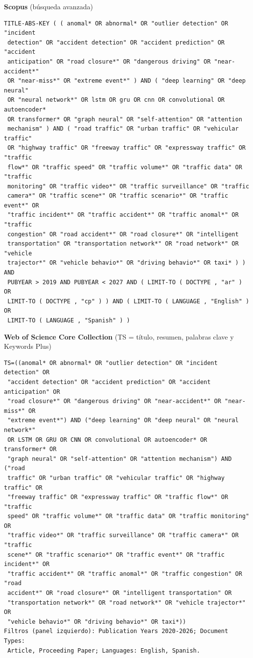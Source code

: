 \documentclass[12pt, a4paper]{article}
\begin{document}
{\footnotesize
\noindent\textbf{Scopus} (b\'{u}squeda avanzada)
\begin{verbatim}
TITLE-ABS-KEY ( ( anomal* OR abnormal* OR "outlier detection" OR "incident
 detection" OR "accident detection" OR "accident prediction" OR "accident
 anticipation" OR "road closure*" OR "dangerous driving" OR "near-accident*"
 OR "near-miss*" OR "extreme event*" ) AND ( "deep learning" OR "deep neural"
 OR "neural network*" OR lstm OR gru OR cnn OR convolutional OR autoencoder*
 OR transformer* OR "graph neural" OR "self-attention" OR "attention
 mechanism" ) AND ( "road traffic" OR "urban traffic" OR "vehicular traffic"
 OR "highway traffic" OR "freeway traffic" OR "expressway traffic" OR "traffic
 flow*" OR "traffic speed" OR "traffic volume*" OR "traffic data" OR "traffic
 monitoring" OR "traffic video*" OR "traffic surveillance" OR "traffic
 camera*" OR "traffic scene*" OR "traffic scenario*" OR "traffic event*" OR
 "traffic incident*" OR "traffic accident*" OR "traffic anomal*" OR "traffic
 congestion" OR "road accident*" OR "road closure*" OR "intelligent
 transportation" OR "transportation network*" OR "road network*" OR "vehicle
 trajector*" OR "vehicle behavio*" OR "driving behavio*" OR taxi* ) ) AND
 PUBYEAR > 2019 AND PUBYEAR < 2027 AND ( LIMIT-TO ( DOCTYPE , "ar" ) OR
 LIMIT-TO ( DOCTYPE , "cp" ) ) AND ( LIMIT-TO ( LANGUAGE , "English" ) OR
 LIMIT-TO ( LANGUAGE , "Spanish" ) )
\end{verbatim}

\noindent\textbf{Web of Science Core Collection} (TS = t\'{i}tulo, resumen, palabras clave y Keywords Plus)
\begin{verbatim}
TS=((anomal* OR abnormal* OR "outlier detection" OR "incident detection" OR
 "accident detection" OR "accident prediction" OR "accident anticipation" OR
 "road closure*" OR "dangerous driving" OR "near-accident*" OR "near-miss*" OR
 "extreme event*") AND ("deep learning" OR "deep neural" OR "neural network*"
 OR LSTM OR GRU OR CNN OR convolutional OR autoencoder* OR transformer* OR
 "graph neural" OR "self-attention" OR "attention mechanism") AND ("road
 traffic" OR "urban traffic" OR "vehicular traffic" OR "highway traffic" OR
 "freeway traffic" OR "expressway traffic" OR "traffic flow*" OR "traffic
 speed" OR "traffic volume*" OR "traffic data" OR "traffic monitoring" OR
 "traffic video*" OR "traffic surveillance" OR "traffic camera*" OR "traffic
 scene*" OR "traffic scenario*" OR "traffic event*" OR "traffic incident*" OR
 "traffic accident*" OR "traffic anomal*" OR "traffic congestion" OR "road
 accident*" OR "road closure*" OR "intelligent transportation" OR
 "transportation network*" OR "road network*" OR "vehicle trajector*" OR
 "vehicle behavio*" OR "driving behavio*" OR taxi*))
Filtros (panel izquierdo): Publication Years 2020-2026; Document Types:
 Article, Proceeding Paper; Languages: English, Spanish.
\end{verbatim}

}
\end{document}
